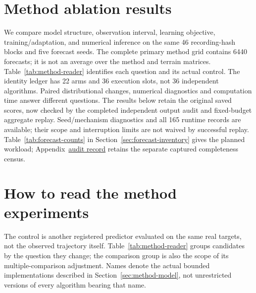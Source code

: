 \section{Method ablation results}
\label{sec:method-results}\hypertarget{sec:method-results}{}
We compare model structure, observation interval, learning objective,
training/adaptation, and numerical inference on the same 46 recording-hash
blocks and five forecast seeds. The complete primary method grid contains
6440 forecasts; it is not an average over the method and terrain matrices.
Table~\ref{tab:method-reader} identifies each question and its actual control.
The identity ledger has 22 arms and 36 execution slots, not 36 independent algorithms.
Paired distributional changes, numerical diagnostics and computation time
answer different questions. The results below retain the original saved scores,
now checked by the completed independent output audit and fixed-budget aggregate
replay. Seed/mechanism diagnostics and all 165 runtime records are available;
their scope and interruption limits are not waived by successful replay.
Table~\ref{tab:forecast-counts} in Section~\ref{sec:forecast-inventory}
gives the planned workload; Appendix~\href{audit-notes.pdf\#sec:execution-coverage}{audit record} retains
the separate captured completeness census.


\section{How to read the method experiments}
\label{sec:method-reader}\hypertarget{sec:method-reader}{}
The control is another registered predictor evaluated on the same real
targets, not the observed trajectory itself. Table~\ref{tab:method-reader}
groups candidates by the question they change; the comparison group is also
the scope of its multiple-comparison adjustment. Names denote the actual
bounded implementations described in Section~\ref{sec:method-model}, not
unrestricted versions of every algorithm bearing that name.

